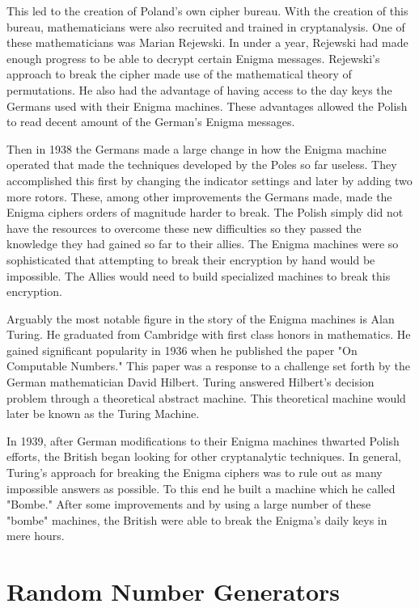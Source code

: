 \documentclass{article}
\begin{document}
    This led to the creation of Poland's own cipher bureau.
    With the creation of this bureau, mathematicians were also recruited
    and trained in cryptanalysis.
    One of these mathematicians was Marian Rejewski.
    In under a year, Rejewski had made enough progress to be able to decrypt
    certain Enigma messages.
    Rejewski's approach to break the cipher made use of the mathematical theory
    of permutations.
    He also had the advantage of having access to the day keys the Germans used
    with their Enigma machines.
    These advantages allowed the Polish to read decent amount of the German's
    Enigma messages.

    Then in 1938 the Germans made a large change in how the Enigma machine operated
    that made the techniques developed by the Poles so far useless.
    They accomplished this first by changing the indicator settings and later
    by adding two more rotors. These, among other improvements the Germans made,
    made the Enigma ciphers orders of magnitude harder to break.
    The Polish simply did not have the resources to overcome these new
    difficulties so they passed the knowledge they had gained so far to
    their allies.
    The Enigma machines were so sophisticated that attempting to break their
    encryption by hand would be impossible. The Allies would need to build specialized
    machines to break this encryption.

    Arguably the most notable figure in the story of the Enigma machines
    is Alan Turing. He graduated from Cambridge with first class honors in
    mathematics.
    He gained significant popularity in 1936 when he published the paper
    "On Computable Numbers." This paper was a response to a challenge
    set forth by the German mathematician David Hilbert.
    Turing answered Hilbert's decision problem through a theoretical abstract
    machine. This theoretical machine would later be known as the Turing Machine.

    In 1939, after German modifications to their Enigma machines thwarted
    Polish efforts, the British began looking for other cryptanalytic techniques.
    In general, Turing's approach for breaking the Enigma ciphers was
    to rule out as many impossible answers as possible.
    To this end he built a machine which he called "Bombe."
    After some improvements and by using a large number of these "bombe" machines,
    the British were able to break the Enigma's daily keys in mere hours.

    \section{Random Number Generators}
\end{document}
